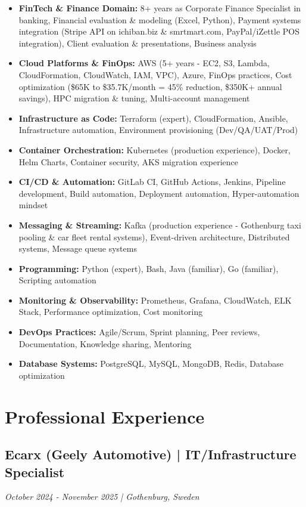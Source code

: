 \documentclass[11pt,a4paper]{article}
\begin{document}
\begin{itemize}[leftmargin=*, itemsep=2pt]
\item \textbf{FinTech \& Finance Domain:} 8+ years as Corporate Finance Specialist in banking, Financial evaluation \& modeling (Excel, Python), Payment systems integration (Stripe API on ichiban.biz \& smrtmart.com, PayPal/iZettle POS integration), Client evaluation \& presentations, Business analysis
\item \textbf{Cloud Platforms \& FinOps:} AWS (5+ years - EC2, S3, Lambda, CloudFormation, CloudWatch, IAM, VPC), Azure, FinOps practices, Cost optimization (\$65K to \$35.7K/month = 45\% reduction, \$350K+ annual savings), HPC migration \& tuning, Multi-account management
\item \textbf{Infrastructure as Code:} Terraform (expert), CloudFormation, Ansible, Infrastructure automation, Environment provisioning (Dev/QA/UAT/Prod)
\item \textbf{Container Orchestration:} Kubernetes (production experience), Docker, Helm Charts, Container security, AKS migration experience
\item \textbf{CI/CD \& Automation:} GitLab CI, GitHub Actions, Jenkins, Pipeline development, Build automation, Deployment automation, Hyper-automation mindset
\item \textbf{Messaging \& Streaming:} Kafka (production experience - Gothenburg taxi pooling \& car fleet rental systems), Event-driven architecture, Distributed systems, Message queue systems
\item \textbf{Programming:} Python (expert), Bash, Java (familiar), Go (familiar), Scripting automation
\item \textbf{Monitoring \& Observability:} Prometheus, Grafana, CloudWatch, ELK Stack, Performance optimization, Cost monitoring
\item \textbf{DevOps Practices:} Agile/Scrum, Sprint planning, Peer reviews, Documentation, Knowledge sharing, Mentoring
\item \textbf{Database Systems:} PostgreSQL, MySQL, MongoDB, Redis, Database optimization
\end{itemize}

\section*{Professional Experience}

\subsection*{Ecarx (Geely Automotive) | IT/Infrastructure Specialist}
\textit{October 2024 - November 2025 | Gothenburg, Sweden}
\end{document}
